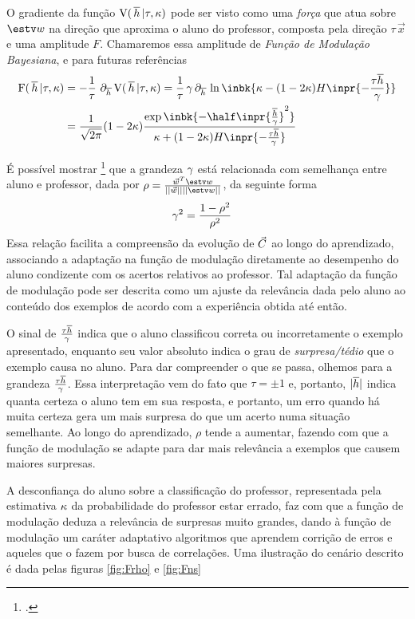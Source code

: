 \newcommand{\EF}{\ensuremath{\mathrm{F}(\,\htv\,|\tau,\ns)}} O gradiente da
função $\mathrm{V}(\,\overline{h}\,|\tau,\kappa)$ pode ser visto como uma \emph{força} que atua sobre $\wt$ na
direção que aproxima o aluno do professor, composta pela direção $\tau\,\vec{x}$
e uma amplitude $F$. Chamaremos essa amplitude de \emph{Função de Modulação
  Bayesiana}, e para futuras referências
\begin{align}\label{eq:f-bayes}
    \EF & = - {1\over\tau}\,\del{\htv} \EV = {1\over\tau}\,\gmt\del{\htv}
    \ln\inbk{\ns-(1-2\ns)H\inpr{-\frac{\tau\htv}{\gmt}}} \notag \\ & =
    \frac{1}{\sqrt{2\pi}}(1-2\ns)
    \frac{\exp\inbk{-\half\inpr{\frac{\htv}{\gmt}}^2}}{\ns + (1-2\ns)
      H\inpr{-\frac{\tau\htv}{\gmt}}}
\end{align}

É possível mostrar \footcite{Kinouchi1996,Vicente1998} que a grandeza
$\gamma$ está relacionada com semelhança entre aluno e professor, dada
por $\rho = \frac{\rl^T\wt}{||\rl||||\wt||}$, da seguinte forma
\begin{align}
    \gamma^2 & = \frac{1-\rho^2}{\rho^2}\label{eq:rho-def}
\end{align}
Essa relação facilita a compreensão da evolução de $\vec{C}$ ao longo do
aprendizado, associando a adaptação na função de modulação diretamente
ao desempenho do aluno condizente com os acertos relativos ao
professor.  Tal adaptação da função de modulação pode ser descrita
como um ajuste da relevância dada pelo aluno ao conteúdo dos exemplos
de acordo com a experiência obtida até então.

O sinal de $\frac{\tau\overline{h}}{\gamma}$ indica que o aluno classificou
correta ou incorretamente o exemplo apresentado, enquanto seu valor
absoluto indica o grau de \emph{surpresa/tédio} que o exemplo causa no
aluno.  Para dar compreender o que se passa, olhemos para a grandeza
$\frac{\tau\overline{h}}{\gamma}$.  Essa interpretação vem do fato que $\tau=\pm
1$ e, portanto, $|\overline{h}|$ indica quanta certeza o aluno tem em sua
resposta, e portanto, um erro quando há muita certeza gera um mais
surpresa do que um acerto numa situação semelhante.  Ao longo do
aprendizado, $\rho$ tende a aumentar, fazendo com que a função de
modulação se adapte para dar mais relevância a exemplos que causem
maiores surpresas.

A desconfiança do aluno sobre a classificação do professor,
representada pela estimativa $\kappa$ da probabilidade do professor estar
errado, faz com que a função de modulação deduza a relevância de
surpresas muito grandes, dando à função de modulação um caráter
adaptativo algoritmos que aprendem corrição de erros e aqueles que o
fazem por busca de correlações.  Uma ilustração do cenário descrito é
dada pelas figuras \ref{fig:Frho} e \ref{fig:Fns}

